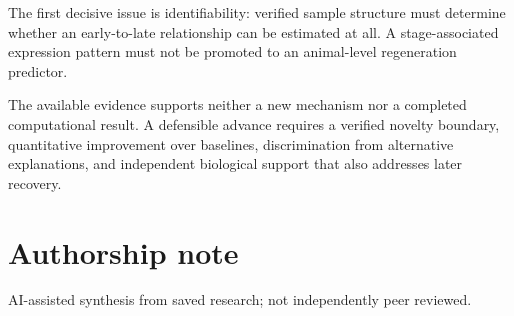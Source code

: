 \documentclass[11pt]{article}
\begin{document}
The first decisive issue is identifiability: verified sample structure must determine whether an early-to-late relationship can be estimated at all. A stage-associated expression pattern must not be promoted to an animal-level regeneration predictor.

The available evidence supports neither a new mechanism nor a completed computational result. A defensible advance requires a verified novelty boundary, quantitative improvement over baselines, discrimination from alternative explanations, and independent biological support that also addresses later recovery.

\section*{Authorship note}
AI-assisted synthesis from saved research; not independently peer reviewed.
\end{document}
